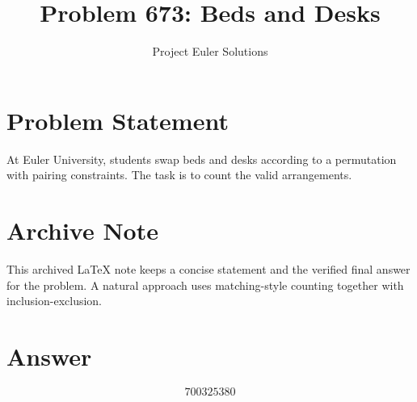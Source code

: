 \documentclass[11pt]{article}
\title{Problem 673: Beds and Desks}
\author{Project Euler Solutions}
\date{}
\begin{document}
\maketitle

\section{Problem Statement}
At Euler University, students swap beds and desks according to a permutation with pairing constraints. The task is to count the valid arrangements.

\section{Archive Note}
This archived LaTeX note keeps a concise statement and the verified final answer for the problem. A natural approach uses matching-style counting together with inclusion-exclusion.

\section{Answer}

\[
\boxed{700325380}
\]
\end{document}
